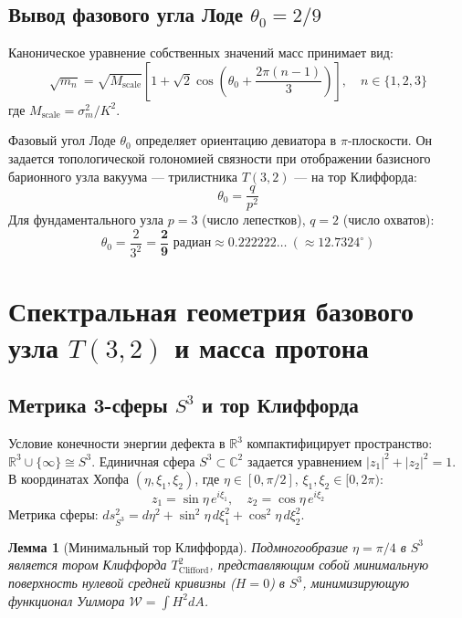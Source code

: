 \documentclass[12pt,a4paper]{article}
\newtheorem{lemma}{Лемма}
\begin{document}
	\subsection{Вывод фазового угла Лоде $\theta_0 = 2/9$}
	Каноническое уравнение собственных значений масс принимает вид:
	\begin{equation}
		\sqrt{m_n} = \sqrt{M_{\text{scale}}} \left[ 1 + \sqrt{2} \cos\left( \theta_0 + \frac{2\pi(n-1)}{3} \right) \right], \quad n \in \{1, 2, 3\}
	\end{equation}
	где $M_{\text{scale}} = \sigma_m^2 / K^2$.
	
	Фазовый угол Лоде $\theta_0$ определяет ориентацию девиатора в $\pi$-плоскости. Он задается топологической голономией связности при отображении базисного барионного узла вакуума — трилистника $T(3,2)$ — на тор Клиффорда:
	\begin{equation}
		\theta_0 = \frac{q}{p^2}
	\end{equation}
	Для фундаментального узла $p=3$ (число лепестков), $q=2$ (число охватов):
	\begin{equation}
		\theta_0 = \frac{2}{3^2} = \mathbf{\frac{2}{9} \text{ радиан}} \approx 0.222222 \dots \ (\approx 12.7324^\circ)
	\end{equation}
	
	\section{Спектральная геометрия базового узла $T(3,2)$ и масса протона}
	
	\subsection{Метрика 3-сферы $S^3$ и тор Клиффорда}
	Условие конечности энергии дефекта в $\mathbb{R}^3$ компактифицирует пространство: $\mathbb{R}^3 \cup \{\infty\} \cong S^3$. Единичная сфера $S^3 \subset \mathbb{C}^2$ задается уравнением $|z_1|^2 + |z_2|^2 = 1$. В координатах Хопфа $(\eta, \xi_1, \xi_2)$, где $\eta \in [0, \pi/2]$, $\xi_1, \xi_2 \in [0, 2\pi)$:
	\begin{equation}
		z_1 = \sin\eta \, e^{i\xi_1}, \quad z_2 = \cos\eta \, e^{i\xi_2}
	\end{equation}
	Метрика сферы: $ds^2_{S^3} = d\eta^2 + \sin^2\eta \, d\xi_1^2 + \cos^2\eta \, d\xi_2^2$.
	
	\begin{lemma}[Минимальный тор Клиффорда]
		Подмногообразие $\eta = \pi/4$ в $S^3$ является тором Клиффорда $T^2_{\mathrm{Clifford}}$, представляющим собой минимальную поверхность нулевой средней кривизны ($H=0$) в $S^3$, минимизирующую функционал Уилмора $\mathcal{W} = \int H^2 dA$.
	\end{lemma}
	
\end{document}
